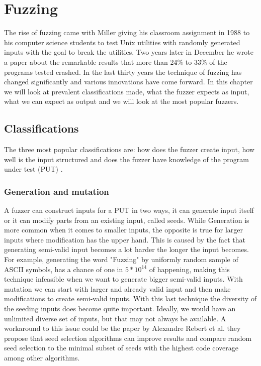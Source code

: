 \chapter{Fuzzing}
\label{cha:2:fuzzing}
\label{fuzzing:intro}
The rise of fuzzing came with Miller giving his classroom assignment \cite{21FuzzingAssignment} in 1988 to his computer science students to test Unix utilities with randomly generated inputs with the goal to break the utilities. Two years later in December he wrote a paper \cite{4originalFuzzingUnixUtils} about the remarkable results that more than 24\% to 33\% of the programs tested crashed.
In the last thirty years the technique of fuzzing has changed significantly and various innovations have come forward. In this chapter we will look at prevalent classifications made, what the fuzzer expects as input, what we can expect as output and we will look at the most popular fuzzers.

\section{Classifications}
\label{cha:2:Classifications}
The three most popular classifications are: how does the fuzzer create input, how well is the input structured and does the fuzzer have knowledge of the program under test (PUT) \cite{30FuzzingHackartandscience, 12Fuzzingasurvey, 13manes2019survey}.

\subsection{Generation and mutation}
\label{cha:2:generationMutation}
A fuzzer can construct inputs for a PUT in two ways, it can generate input itself or it can modify parts from an existing input, called seeds. While Generation is more common when it comes to smaller inputs, the opposite is true for larger inputs where modification has the upper hand. This is caused by the fact that generating semi-valid input becomes a lot harder the longer the input becomes. For example, generating the word "Fuzzing" by uniformly random sample of ASCII symbols, has a chance of one in $5*10^{14}$ of happening, making this technique infeasible when we want to generate bigger semi-valid inputs. With mutation we can start with larger and already valid input and then make modifications to create semi-valid inputs. With this last technique the diversity of the seeding inputs does become quite important. Ideally, we would have an unlimited diverse set of inputs, but that may not always be available. A workaround to this issue could be the paper by Alexandre Rebert et al. \cite{14rebert2014seedselecting} they propose that seed selection algorithms can improve results and compare random seed selection to the minimal subset of seeds with the highest code coverage among other algorithms. 

